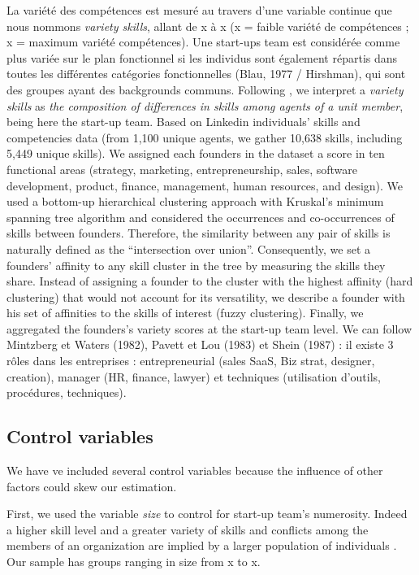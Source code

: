\documentclass[12pt]{article}
\begin{document}
La variété des compétences est mesuré au travers d'une variable continue que nous nommons \textit{variety skills}, allant de x à x (x = faible variété de compétences ; x = maximum variété compétences). Une start-ups team est considérée comme plus variée sur le plan fonctionnel si les individus sont également répartis dans toutes les différentes catégories fonctionnelles (Blau, 1977 / Hirshman), qui sont des groupes ayant des backgrounds communs. Following \citet{harrison2007s}, we interpret a \textit{variety skills} as \textit{the composition of differences in skills among agents of a unit member}, being here the start-up team. Based on Linkedin individuals' skills and competencies data (from 1,100 unique agents, we gather 10,638 skills, including 5,449 unique skills). We assigned each founders in the dataset a score in ten functional areas (strategy, marketing, entrepreneurship, sales, software development, product, finance, management, human resources, and design). We used a bottom-up hierarchical clustering approach with Kruskal's minimum spanning tree algorithm \citep{kruskal1956shortest} and considered the occurrences and co-occurrences of skills between founders. Therefore, the similarity between any pair of skills is naturally defined as the “intersection over union”. Consequently, we set a founders' affinity to any skill cluster in the tree by measuring the skills they share. Instead of assigning a founder to the cluster with the highest affinity (hard clustering) that would not account for its versatility, we describe a founder with his set of affinities to the skills of interest (fuzzy clustering). Finally, we aggregated the founders's variety scores at the start-up team level. We can follow Mintzberg et Waters (1982), Pavett et Lou (1983) et Shein (1987) : il existe 3 rôles dans les entreprises : entrepreneurial (sales SaaS, Biz strat, designer, creation), manager (HR, finance, lawyer) et techniques (utilisation d'outils, procédures, techniques).

\subsection{Control variables}

We have ve included several control variables because the influence of other factors could skew our estimation.

First, we used the variable \textit{size} to control for start-up team's numerosity. Indeed a higher skill level and a greater variety of skills and conflicts among the members of an organization are implied by a larger population of individuals \citep{eisenhardt1990organizational}. Our sample has groups ranging in size from x to x.
\end{document}
